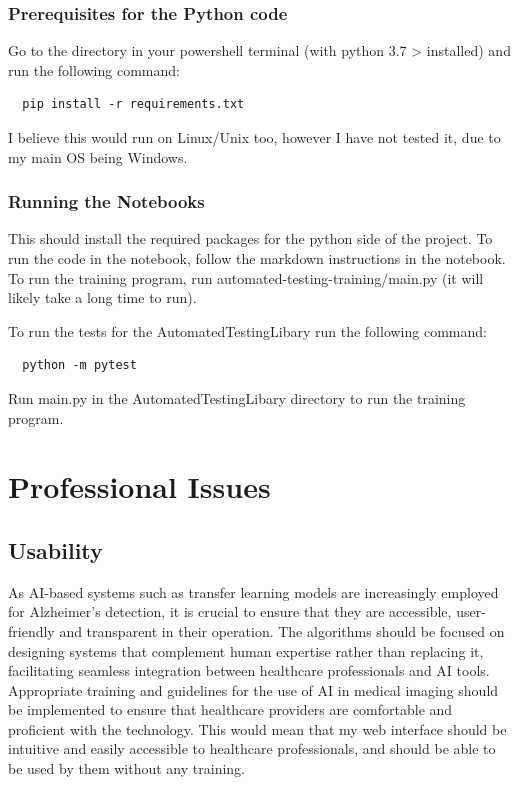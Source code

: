 \documentclass[]{final_report}
\begin{document}
\subsection{Prerequisites for the Python code}
Go to the directory in your powershell terminal (with python 3.7 > installed) and run the following command:
\begin{lstlisting}
  pip install -r requirements.txt
\end{lstlisting}

I believe this would run on Linux/Unix too, however I have not tested it, due to my main OS being Windows.

\subsection{Running the Notebooks}

This should install the required packages for the python side of the project.
To run the code in the notebook, follow the markdown instructions in the notebook.
To run the training program, run automated-testing-training/main.py (it will likely take a long time to run).

To run the tests for the AutomatedTestingLibary run the following command:
\begin{lstlisting}
  python -m pytest 
\end{lstlisting}
Run main.py in the AutomatedTestingLibary directory to run the training program.



\chapter{Professional Issues}


\section{Usability}
As AI-based systems such as transfer learning models are increasingly employed for Alzheimer's detection, it is crucial to ensure that they are accessible, user-friendly and transparent in their operation. The algorithms should be focused on designing systems that complement human expertise rather than replacing it, facilitating seamless integration between healthcare professionals and AI tools. Appropriate training and guidelines for the use of AI in medical imaging should be implemented to ensure that healthcare providers are comfortable and proficient with the technology. This would mean that my web interface should be intuitive and easily accessible to healthcare professionals, and should be able to be used by them without any training.
\end{document}
